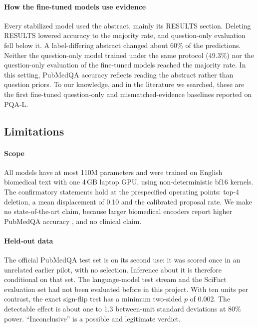 \paragraph{How the fine-tuned models use evidence}
Every stabilized model used the abstract, mainly its RESULTS section. Deleting RESULTS lowered accuracy to the majority rate, and question-only
evaluation fell below it. A label-differing abstract changed about 60\% of the predictions. Neither the question-only
model trained under the same protocol (49.3\%) nor the question-only evaluation of the fine-tuned models
reached the majority rate. In this setting, PubMedQA accuracy reflects reading the abstract rather than question
priors. To our knowledge, and in the literature we searched, these are the first fine-tuned question-only and
mismatched-evidence baselines reported on PQA-L.

\subsection{Limitations}
\paragraph{Scope}
All models have at most 110M parameters and were trained on English biomedical text with one 4\,GB laptop GPU, using
non-deterministic bf16 kernels. The confirmatory statements hold at the prespecified operating points: top-4
deletion, a mean displacement of 0.10 and the calibrated proposal rate. We make no state-of-the-art claim,
because larger biomedical encoders report higher PubMedQA accuracy \citep{yasunaga2022linkbert,tinn2023finetuning}, and no clinical claim.

\paragraph{Held-out data}
The official PubMedQA test set is on its second use: it was scored once in an unrelated earlier pilot, with no
selection. Inference about it is therefore conditional on that set. The language-model test stream and the SciFact
evaluation set had not been evaluated before in this project. With ten units per contrast, the exact sign-flip test has a minimum two-sided $p$ of
0.002. The detectable effect is about one to 1.3 between-unit standard deviations at 80\% power. ``Inconclusive'' is a
possible and legitimate verdict.

